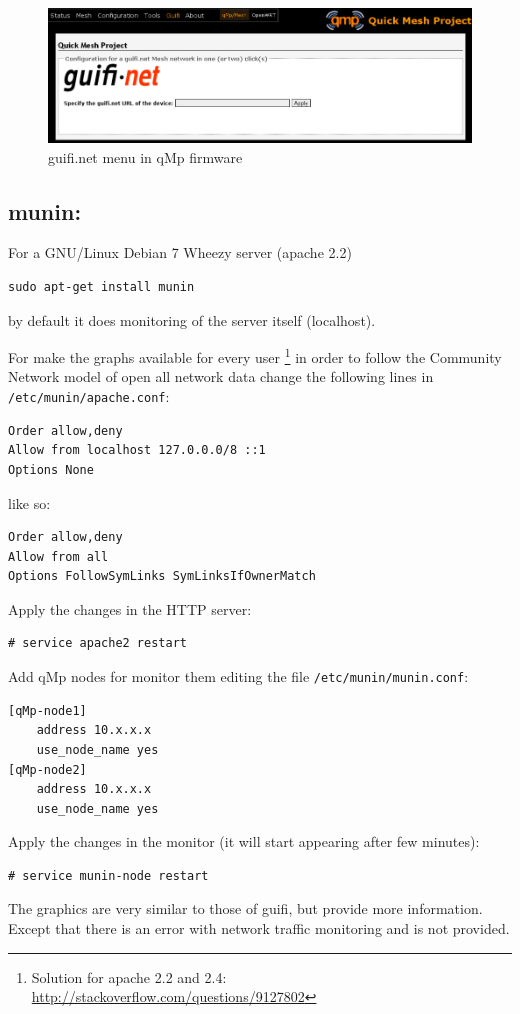 \documentclass[11pt]{article}
\begin{document}
\begin{figure}[htb]
\centering
\includegraphics[width=.9\linewidth]{./img/qMp-basics-scrot/qmpguifi.png}
\caption{\label{fig:qmpguifi}guifi.net menu in qMp firmware}
\end{figure}
\subsection{\textbf{munin}:}
\label{sec-11-2}
For a GNU/Linux Debian 7 Wheezy server (apache 2.2)
\begin{verbatim}
sudo apt-get install munin
\end{verbatim}
by default it does monitoring of the server itself (localhost).

For make the graphs available for every user \footnote{Solution for apache 2.2 and 2.4: \url{http://stackoverflow.com/questions/9127802}} in order to follow the
Community Network model of open all network data change the
following lines in \texttt{/etc/munin/apache.conf}:
\begin{verbatim}
Order allow,deny
Allow from localhost 127.0.0.0/8 ::1
Options None
\end{verbatim}
like so:
\begin{verbatim}
Order allow,deny
Allow from all
Options FollowSymLinks SymLinksIfOwnerMatch
\end{verbatim}
Apply the changes in the HTTP server:
\begin{verbatim}
# service apache2 restart
\end{verbatim}

Add qMp nodes for monitor them editing the file \texttt{/etc/munin/munin.conf}:
\begin{verbatim}
[qMp-node1]
    address 10.x.x.x
    use_node_name yes
[qMp-node2]
    address 10.x.x.x
    use_node_name yes
\end{verbatim}

Apply the changes in the monitor (it will start appearing after few
minutes):
\begin{verbatim}
# service munin-node restart
\end{verbatim}
The graphics are very similar to those of guifi, but provide more
information. Except that there is an error with network traffic
monitoring and is not provided.
\end{document}
